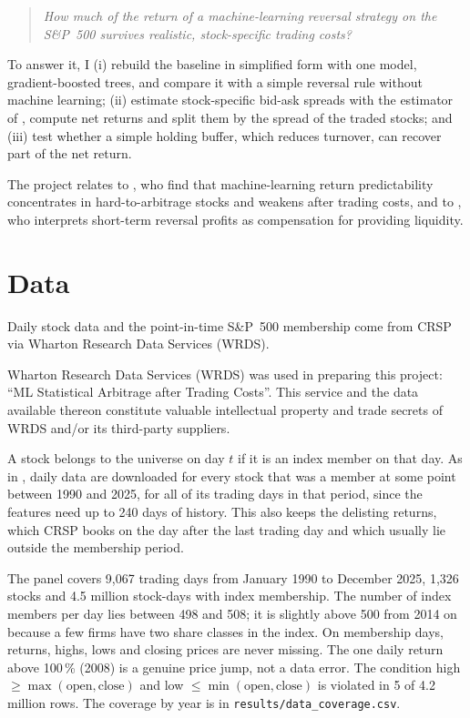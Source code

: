 \documentclass[11pt,a4paper]{article}
\theoremstyle{definition}
\theoremstyle{remark}
\begin{document}
\begin{quote}
\emph{How much of the return of a machine-learning reversal strategy on the
S\&P~500 survives realistic, stock-specific trading costs?}
\end{quote}

To answer it, I
(i) rebuild the baseline in simplified form with one model, gradient-boosted
trees, and compare it with a simple reversal rule without machine learning;
(ii) estimate stock-specific bid-ask spreads with the estimator of
\citet{corwin2012simple}, compute net returns and split them by the spread
of the traded stocks; and
(iii) test whether a simple holding buffer, which reduces turnover, can
recover part of the net return.

The project relates to \citet{avramov2023machine}, who find that
machine-learning return predictability concentrates in hard-to-arbitrage stocks
and weakens after trading costs, and to \citet{nagel2012evaporating}, who
interprets short-term reversal profits as compensation for providing liquidity.


\section{Data}

Daily stock data and the point-in-time S\&P~500 membership come from CRSP via
Wharton Research Data Services (WRDS).

Wharton Research Data Services (WRDS) was used in preparing this project: ``ML
Statistical Arbitrage after Trading Costs''. This service and the data available
thereon constitute valuable intellectual property and trade secrets of WRDS
and/or its third-party suppliers.

A stock belongs to the universe on day $t$ if it is an index member on that
day. As in \citet{krauss2017deep}, daily data are downloaded for every stock
that was a member at some point between 1990 and 2025, for all of its trading
days in that period, since the features need up to 240 days of history. This
also keeps the delisting returns, which CRSP books on the day after the last
trading day and which usually lie outside the membership period.

The panel covers 9{,}067 trading days from January 1990 to December 2025,
1{,}326 stocks and 4.5 million stock-days with index membership. The number of
index members per day lies between 498 and 508; it is slightly above 500 from
2014 on because a few firms have two share classes in the index. On membership
days, returns, highs, lows and closing prices are never missing. The one daily
return above 100\,\% (2008) is a genuine price jump, not a data error. The condition
high $\ge \max(\text{open}, \text{close})$ and low $\le \min(\text{open},
\text{close})$ is violated in 5 of 4.2 million rows. The coverage by year is in
\texttt{results/data\_coverage.csv}.
\end{document}
